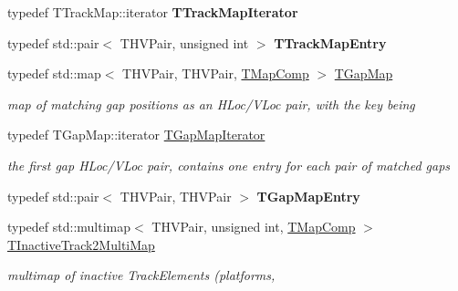 \begin{DoxyCompactItemize}
\mbox{\label{class_t_track_a89e099488b224b6b85e2f112c4889fd0}} 
typedef T\+Track\+Map\+::iterator {\bfseries T\+Track\+Map\+Iterator}
\item 
\mbox{\label{class_t_track_a88632999c299ea51ecc1a7eceb60040e}} 
typedef std\+::pair$<$ T\+H\+V\+Pair, unsigned int $>$ {\bfseries T\+Track\+Map\+Entry}
\item 
\mbox{\label{class_t_track_a57d1f751f59c96c16918a044b3d271f7}} 
typedef std\+::map$<$ T\+H\+V\+Pair, T\+H\+V\+Pair, \mbox{\hyperlink{class_t_map_comp}{T\+Map\+Comp}} $>$ \mbox{\hyperlink{class_t_track_a57d1f751f59c96c16918a044b3d271f7}{T\+Gap\+Map}}
\begin{DoxyCompactList}\small\item\em map of matching gap positions as an H\+Loc/\+V\+Loc pair, with the key being \end{DoxyCompactList}\item 
\mbox{\label{class_t_track_a59d0d360b7897d3364135f3882ec495a}} 
typedef T\+Gap\+Map\+::iterator \mbox{\hyperlink{class_t_track_a59d0d360b7897d3364135f3882ec495a}{T\+Gap\+Map\+Iterator}}
\begin{DoxyCompactList}\small\item\em the first gap H\+Loc/\+V\+Loc pair, contains one entry for each pair of matched gaps \end{DoxyCompactList}\item 
\mbox{\label{class_t_track_a9f68c117c1cee4a7d767de13a4232925}} 
typedef std\+::pair$<$ T\+H\+V\+Pair, T\+H\+V\+Pair $>$ {\bfseries T\+Gap\+Map\+Entry}
\item 
\mbox{\label{class_t_track_ab54f3c0560218084f75c55ff87409417}} 
typedef std\+::multimap$<$ T\+H\+V\+Pair, unsigned int, \mbox{\hyperlink{class_t_map_comp}{T\+Map\+Comp}} $>$ \mbox{\hyperlink{class_t_track_ab54f3c0560218084f75c55ff87409417}{T\+Inactive\+Track2\+Multi\+Map}}
\begin{DoxyCompactList}\small\item\em multimap of inactive Track\+Elements (platforms, \end{DoxyCompactList}\item 
\mbox{\label{class_t_track_a6072881896a545945cbcc26e8307bb68}} 

\end{DoxyCompactItemize}
